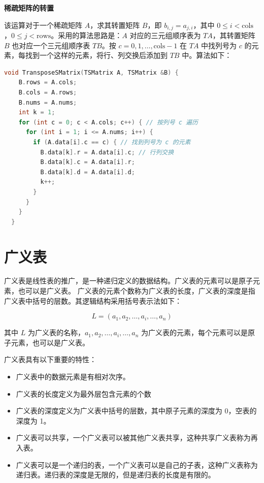 \documentclass[lang=cn,newtx,10pt,scheme=chinese]{../elegantbook}
\begin{document}
\textbf{稀疏矩阵的转置}

该运算对于一个稀疏矩阵 $A$，求其转置矩阵 $B$，即 $b_{i,j} = a_{j,i}$，其中 $0 \leq i < \text{cols}$，$0 \leq j < \text{rows}$。采用的算法思路是：$A$ 对应的三元组顺序表为 $TA$，其转置矩阵 $B$ 也对应一个三元组顺序表 $TB$。按 $c = 0, 1, \dots, \text{cols}-1$ 在 $TA$ 中找列号为 $c$ 的元素，每找到一个这样的元素，将行、列交换后添加到 $TB$ 中。算法如下：

\begin{lstlisting}[language=C++, caption={稀疏矩阵的转置}]
  void TransposeSMatrix(TSMatrix A, TSMatrix &B) {
    B.rows = A.cols;
    B.cols = A.rows;
    B.nums = A.nums;
    int k = 1;
    for (int c = 0; c < A.cols; c++) { // 按列号 c 遍历
      for (int i = 1; i <= A.nums; i++) {
        if (A.data[i].c == c) { // 找到列号为 c 的元素
          B.data[k].r = A.data[i].c; // 行列交换
          B.data[k].c = A.data[i].r;
          B.data[k].d = A.data[i].d;
          k++;
        }
      }
    }
  }
\end{lstlisting}

\section{广义表}

广义表是线性表的推广，是一种递归定义的数据结构。广义表的元素可以是原子元素，也可以是广义表。
广义表的元素个数称为广义表的长度，广义表的深度是指广义表中括号的层数。其逻辑结构采用括号表示法如下：

\[
L = (a_1, a_2, \dots, a_i, \dots, a_n)
\]

其中 $L$ 为广义表的名称，$a_1, a_2, \dots, a_i, \dots, a_n$ 为广义表的元素，每个元素可以是原子元素，也可以是广义表。

广义表具有以下重要的特性：

\begin{itemize}
  \item 广义表中的数据元素是有相对次序。
  \item 广义表的长度定义为最外层包含元素的个数
  \item 广义表的深度定义为广义表中括号的层数，其中原子元素的深度为 0，空表的深度为 1。
  \item 广义表可以共享，一个广义表可以被其他广义表共享，这种共享广义表称为再入表。
  \item 广义表可以是一个递归的表，一个广义表可以是自己的子表，这种广义表称为递归表。递归表的深度是无限的，但是递归表的长度是有限的。
\end{itemize}
\end{document}
